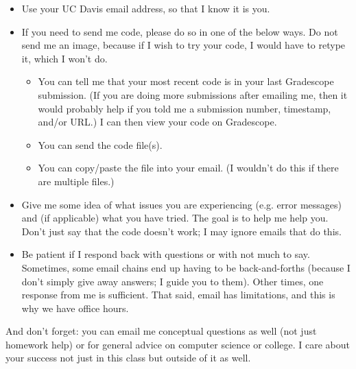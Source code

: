 \documentclass{article}
\begin{document}
\begin{itemize}[itemsep=0mm,parsep=0pt]
\item Use your UC Davis email address, so that I know it is you.
\item If you need to send me code, please do so in one of the below ways. Do not send me an image, because if I wish to try your code, I would have to retype it, which I won't do.
    \begin{itemize}[itemsep=0mm, parsep=0pt]
    \item You can tell me that your most recent code is in your last Gradescope submission. (If you are doing more submissions after emailing me, then it would probably help if you told me a submission number, timestamp, and/or URL.) I can then view your code on Gradescope.
    \item You can send the code file(s). 
    \item You can copy/paste the file into your email. (I wouldn't do this if there are multiple files.)
    \end{itemize}
\item Give me some idea of what issues you are experiencing (e.g. error messages) and (if applicable) what you have tried. The goal is to help me help you. Don't just say that the code doesn't work; I may ignore emails that do this.
\item Be patient if I respond back with questions or with not much to say. Sometimes, some email chains end up having to be back-and-forths (because I don't simply give away answers; I guide you to them). Other times, one response from me is sufficient. That said, email has limitations, and this is why we have office hours.
\end{itemize}

And don't forget: you can email me conceptual questions as well (not just homework help) or for general advice on computer science or college. I care about your success not just in this class but outside of it as well.
\end{document}
